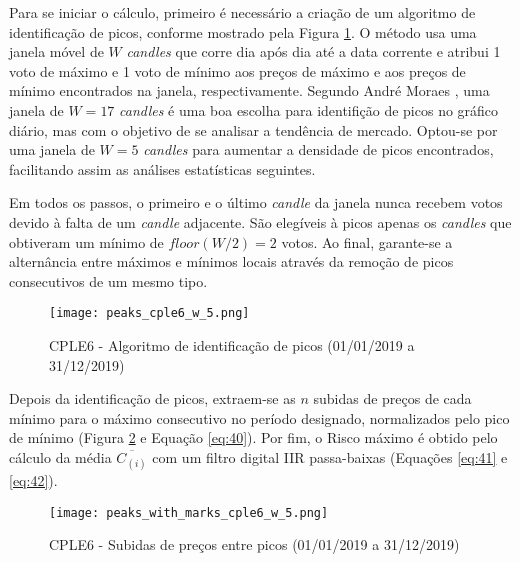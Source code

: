 \begin{itemize}
    Para se iniciar o cálculo, primeiro é necessário a criação de um algoritmo de identificação de picos, conforme mostrado pela Figura \ref{fig:106}. O método usa uma janela móvel de \begin{math} W \end{math} \textit{candles} que corre dia após dia até a data corrente e atribui 1 voto de máximo e 1 voto de mínimo aos preços de máximo e aos preços de mínimo encontrados na janela, respectivamente. Segundo André Moraes \cite{moraes2007se}, uma janela de \begin{math} W = 17 \end{math} \textit{candles} é uma boa escolha para identifição de picos no gráfico diário, mas com o objetivo de se analisar a tendência de mercado. Optou-se por uma janela de \begin{math} W = 5 \end{math} \textit{candles} para aumentar a densidade de picos encontrados, facilitando assim as análises estatísticas seguintes.

    Em todos os passos, o primeiro e o último \textit{candle} da janela nunca recebem votos devido à falta de um \textit{candle} adjacente. São elegíveis à picos apenas os \textit{candles} que obtiveram um mínimo de \begin{math}  floor(W / 2) = 2 \end{math} votos. Ao final, garante-se a alternância entre máximos e mínimos locais através da remoção de picos consecutivos de um mesmo tipo.

    \begin{figure}[!htb]
        \texttt{[image: peaks\_cple6\_w\_5.png]}
        \centering
        \caption{CPLE6 - Algoritmo de identificação de picos (01/01/2019 a 31/12/2019)}
        \label{fig:106}
    \end{figure}

    Depois da identificação de picos, extraem-se as \begin{math} n \end{math} subidas de preços de cada mínimo para o máximo consecutivo no período designado, normalizados pelo pico de mínimo (Figura \ref{fig:107} e Equação \ref{eq:40}). Por fim, o Risco máximo é obtido pelo cálculo da média \begin{math} \overline{C_{(i)}} \end{math} com um filtro digital IIR passa-baixas (Equações \ref{eq:41} e \ref{eq:42}).

    \begin{figure}[!htb]
        \texttt{[image: peaks\_with\_marks\_cple6\_w\_5.png]}
        \centering
        \caption{CPLE6 - Subidas de preços entre picos (01/01/2019 a 31/12/2019)}
        \label{fig:107}
    \end{figure}


\end{itemize}
